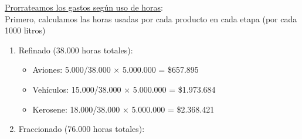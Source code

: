 \documentclass[10pt,a4paper]{article}
\begin{document}
\begin{enumerate}
\begin{itemize}
    \end{itemize}

    \underline{Prorrateamos los gastos según uso de horas}: \\

    Primero, calculamos las horas usadas por cada producto en cada etapa (por cada 1000 litros)

    \begin{center}
    \end{center}

    \vspace{0.5em}

    \begin{enumerate}[label=\alph*)]

        \item Refinado (38.000 horas totales):
        
        \begin{itemize}

            \item Aviones: 5.000/38.000 × 5.000.000 = \$657.895
            \item Vehículos: 15.000/38.000 × 5.000.000 = \$1.973.684
            \item Kerosene: 18.000/38.000 × 5.000.000 = \$2.368.421 \\
    
        \end{itemize}

        \item Fraccionado (76.000 horas totales):
        
        \begin{itemize}


\end{itemize}
\end{enumerate}
\end{enumerate}
\end{document}
